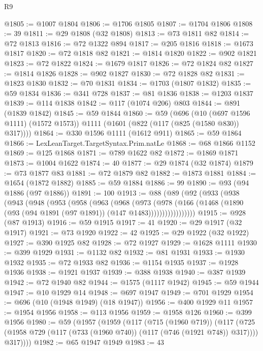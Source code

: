 \begin{lexlean}{R9}
\begin{coremodule}
@1805 := @1007 @1804
@1806 := @1706 @1805
@1807 := @1704 @1806
@1808 := 39
@1811 := @29 @1808 (@32 @1808)
@1813 := @73 @1811 @82
@1814 := @72 @1813
@1816 := @72 @1322 @894
@1817 := @205 @1816
@1818 := @1673 @1817
@1820 := @72 @1818 @82
@1821 := @1814 @1820
@1822 := @902 @1821
@1823 := @72 @1822
@1824 := @1679 @1817
@1826 := @72 @1824 @82
@1827 := @1814 @1826
@1828 := @902 @1827
@1830 := @72 @1828 @82
@1831 := @1823 @1830
@1832 := @70 @1831
@1834 := @1703 (@1807 @1832)
@1835 := @59 @1834
@1836 := @341 @728
@1837 := @81 @1836
@1838 := @1203 @1837
@1839 := @114 @1838
@1842 := @117 (@1074 @206) @803
@1844 := @891 (@1839 @1842)
@1845 := @59 @1844
@1860 := @59
    (@696
      (@10 (@697 @1596 @1111) (@1572 @1573))
      @1111
      (@1601 (@822 (@117 (@825 (@1580 @830)) @317))))
@1864 := @330 @1596 @1111 (@1612 @911)
@1865 := @59 @1864
@1866 := LexLeanTarget.TargetSyntax.Prim.natLe
@1868 := @68 @1866 @1152
@1869 := @125 @1868
@1871 := @789 @1622 @82
@1872 := @1869 @1871
@1873 := @1004 @1622
@1874 := 40
@1877 := @29 @1874 (@32 @1874)
@1879 := @73 @1877 @83
@1881 := @72 @1879 @82
@1882 := @1873 @1881
@1884 := @1654 (@1872 @1882)
@1885 := @59 @1884
@1886 := 99
@1890 := @93 (@94 @1886 (@97 @1886))
@1891 := 100
@1913 := @88
    (@89
      (@92
        (@933
          (@938
            (@943
              (@948
                (@953
                  (@958
                    (@963
                      (@968
                        (@973
                          (@978
                            (@166
                              (@1468
                                (@1890 (@93 (@94 @1891 (@97 @1891)) (@147 @1483)))))))))))))))))
@1915 := @928 (@87 @1913)
@1916 := @59 @1915
@1917 := 41
@1920 := @29 @1917 (@32 @1917)
@1921 := @73 @1920
@1922 := 42
@1925 := @29 @1922 (@32 @1922)
@1927 := @390 @1925 @82
@1928 := @72 @1927
@1929 := @1628 @1111
@1930 := @399 @1929
@1931 := @1132 @82
@1932 := @81 @1931
@1933 := @1930 @1932
@1935 := @72 @1933 @82
@1936 := @1154 @1935
@1937 := @1928 @1936
@1938 := @1921 @1937
@1939 := @388 @1938
@1940 := @387 @1939
@1942 := @72 @1940 @82
@1944 := @1575 (@1117 @1942)
@1945 := @59 @1944
@1947 := @10 @1929 @14
@1948 := @697 @1947
@1949 := @701 @1929
@1954 := @696 (@10 (@1948 @1949) (@18 @1947))
@1956 := @400 @1929 @11
@1957 := @1954 @1956
@1958 := @113 @1956
@1959 := @1958 @126
@1960 := @399 @1956
@1980 := @59
    (@1957
      (@1959
        (@117
          (@715 (@1960 @719))
          (@117
            (@725 (@1958 @729 (@117 (@733 (@1960 @740)) (@117 (@746 (@1921 @748)) @317))))
            @317))))
@1982 := @65 @1947 @1949
@1983 := 43

\end{coremodule}
\end{lexlean}
